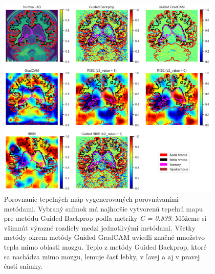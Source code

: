 \begin{figure}[h!]
    \centering
    \includegraphics[width=14.5cm]{assets/images/method_evaluation_1.png}
    \caption{Porovnanie tepelných máp vygenerovaných porovnávaními metódami. Vybraný snímok má najhoršie vytvorenú tepelnú mapu pre metódu Guided Backprop podľa metriky \textit{C = 0.839}. Môžeme si všimnúť výrazné rozdiely medzi jednotlivými metódami. Všetky metódy okrem metódy Guided GradCAM uviedli značné množstvo tepla mimo oblasti mozgu. Teplo z metódy Guided Backprop, ktoré sa nachádza mimo mozgu, lemuje časť lebky, v ľavej a aj v pravej časti snímky.}
    \label{fig:method_evaluation_1}
\end{figure}

